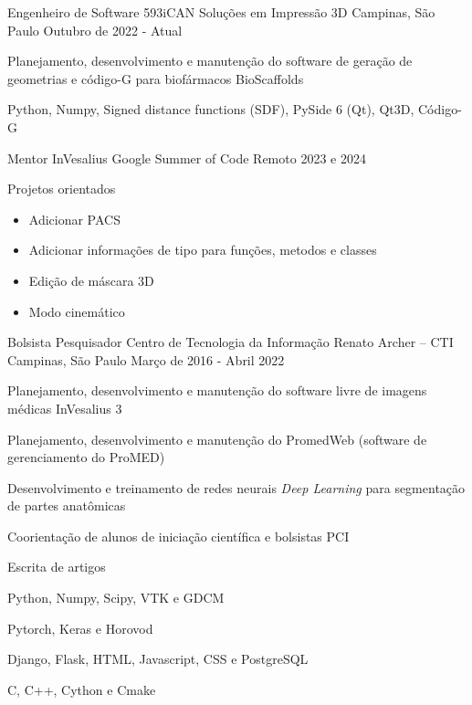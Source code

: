 \begin{cventries}

  \cventry
    {Engenheiro de Software}
    {593iCAN Soluções em Impressão 3D}
    {Campinas, São Paulo}
    {Outubro de 2022 - Atual}
    {
      \begin{cvitems}
      \item {Planejamento, desenvolvimento e manutenção do software de geração de geometrias e código-G para biofármacos BioScaffolds}
      \item {Python, Numpy, Signed distance functions (SDF), PySide 6 (Qt), Qt3D, Código-G}
      \end{cvitems}
    }

  \cventry
  {Mentor InVesalius}
  {Google Summer of Code}
  {Remoto}
  {2023 e 2024}
  {
    \begin{cvitems}
    \item{Projetos orientados}
      \begin{itemize}
      \item{Adicionar PACS}
      \item{Adicionar informações de tipo para funções, metodos e classes}
      \item{Edição de máscara 3D}
      \item{Modo cinemático}
      \end{itemize}
    \end{cvitems}
  }

  \cventry
    {Bolsista Pesquisador}
    {Centro de Tecnologia da Informação Renato Archer – CTI}
    {Campinas, São Paulo}
    {Março de 2016 - Abril 2022}
    {
      \begin{cvitems}
      \item {Planejamento, desenvolvimento e manutenção do software livre de imagens médicas InVesalius 3}
      \item {Planejamento, desenvolvimento e manutenção do PromedWeb (software de gerenciamento do ProMED)}
      \item {Desenvolvimento e treinamento de redes neurais \textit{Deep Learning} para segmentação de partes anatômicas}
      \item {Coorientação de alunos de iniciação científica e bolsistas PCI}
      \item {Escrita de artigos}
      \item {Python, Numpy, Scipy, VTK e GDCM}
      \item {Pytorch, Keras e Horovod}
      \item {Django, Flask, HTML, Javascript, CSS e PostgreSQL}
      \item {C, C++, Cython e Cmake}
      \end{cvitems}
    }


\end{cventries}
